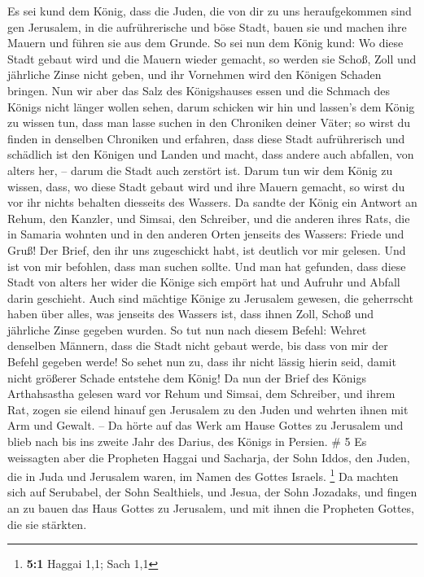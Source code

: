  Es sei kund dem König, dass die Juden, die von dir zu uns
heraufgekommen sind gen Jerusalem, in die aufrührerische und böse Stadt,
bauen sie und machen ihre Mauern und führen sie aus dem Grunde.
 So sei nun dem König kund: Wo diese Stadt gebaut wird und
die Mauern wieder gemacht, so werden sie Schoß, Zoll und jährliche Zinse
nicht geben, und ihr Vornehmen wird den Königen Schaden bringen.
 Nun wir aber das Salz des Königshauses essen und die
Schmach des Königs nicht länger wollen sehen, darum schicken wir hin und
lassen's dem König zu wissen tun,  dass man lasse suchen in
den Chroniken deiner Väter; so wirst du finden in denselben Chroniken
und erfahren, dass diese Stadt aufrührerisch und schädlich ist den
Königen und Landen und macht, dass andere auch abfallen, von alters her,
-- darum die Stadt auch zerstört ist.  Darum tun wir dem
König zu wissen, dass, wo diese Stadt gebaut wird und ihre Mauern
gemacht, so wirst du vor ihr nichts behalten diesseits des Wassers.
 Da sandte der König ein Antwort an Rehum, den Kanzler, und
Simsai, den Schreiber, und die anderen ihres Rats, die in Samaria
wohnten und in den anderen Orten jenseits des Wassers: Friede und Gruß!
 Der Brief, den ihr uns zugeschickt habt, ist deutlich vor
mir gelesen.  Und ist von mir befohlen, dass man suchen
sollte. Und man hat gefunden, dass diese Stadt von alters her wider die
Könige sich empört hat und Aufruhr und Abfall darin geschieht.
 Auch sind mächtige Könige zu Jerusalem gewesen, die
geherrscht haben über alles, was jenseits des Wassers ist, dass ihnen
Zoll, Schoß und jährliche Zinse gegeben wurden.  So tut nun
nach diesem Befehl: Wehret denselben Männern, dass die Stadt nicht
gebaut werde, bis dass von mir der Befehl gegeben werde! 
So sehet nun zu, dass ihr nicht lässig hierin seid, damit nicht größerer
Schade entstehe dem König!  Da nun der Brief des Königs
Arthahsastha gelesen ward vor Rehum und Simsai, dem Schreiber, und ihrem
Rat, zogen sie eilend hinauf gen Jerusalem zu den Juden und wehrten
ihnen mit Arm und Gewalt. --  Da hörte auf das Werk am
Hause Gottes zu Jerusalem und blieb nach bis ins zweite Jahr des Darius,
des Königs in Persien. \# 5  Es weissagten aber die
Propheten Haggai und Sacharja, der Sohn Iddos, den Juden, die in Juda
und Jerusalem waren, im Namen des Gottes Israels. \footnote{\textbf{5:1}
  Haggai 1,1; Sach 1,1}  Da machten sich auf Serubabel, der
Sohn Sealthiels, und Jesua, der Sohn Jozadaks, und fingen an zu bauen
das Haus Gottes zu Jerusalem, und mit ihnen die Propheten Gottes, die
sie stärkten.

